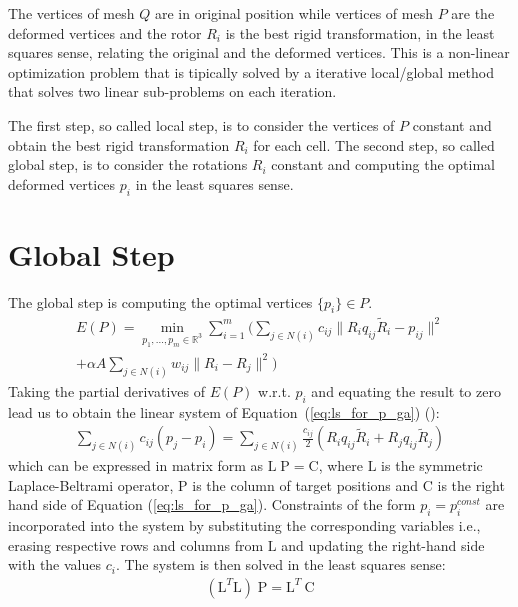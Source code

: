 \documentclass{birkjour}
\numberwithin{equation}{section}
\begin{document}
The vertices of mesh $Q$ are in original position while vertices of mesh $P$ are the deformed vertices and the rotor $R_i$ is the best rigid transformation, in the least squares sense, relating the original and the deformed vertices.
This is a non-linear optimization problem that is tipically solved by a iterative local/global method that solves two linear sub-problems on each iteration. 

The first step, so called local step, is to consider the vertices of $P$ constant and obtain the best rigid transformation $R_i$ for each cell. The second step, so called global step, is to consider the rotations $R_i$ constant and computing the optimal deformed vertices $p_i$ in the least squares sense. 

\section{Global Step}

The global step is computing the optimal vertices $\{p_i\} \in P$.
\begin{eqnarray*}
E(P) = \min_{p_1,...,p_m \in \mathbb R^3} \sum_{i=1}^m  (  \sum_{j \in N(i)} { c_{ij} \|R_i q_{ij} \tilde R_i -  p_{ij}\|^2 } \\
+ \alpha A \sum_{j \in N(i)} { w_{ij} \|R_i - R_j\|^2 } )
\end{eqnarray*}
Taking the partial derivatives of $E(P)$ w.r.t. $p_i$ and equating the result to zero lead us to obtain the linear system of Equation~(\ref{eq:ls_for_p_ga}) (\cite{Lopez2013}):
\begin{eqnarray}
\label{eq:ls_for_p_ga}
\sum_{j \in N(i)} { c_{ij} (p_j - p_i) } = \sum_{j \in N(i)} { \frac{c_{ij}}{2} (R_i q_{ij} \tilde  R_i + R_j q_{ij} \tilde R_j) }
\end{eqnarray}
which can be expressed in matrix form as $\mathrm L \; \mathrm P = \mathrm C$, where $\mathrm L$ is the symmetric Laplace-Beltrami operator, $\mathrm P$ is the column of target positions and $\mathrm C$ is the right hand side of Equation (\ref{eq:ls_for_p_ga}). Constraints of the form $p_i = p^{const}_i$ are incorporated into the system by substituting the corresponding variables i.e., erasing respective rows and columns from $\mathrm L$ and updating the right-hand side with the values $c_i$. The system is then solved in the least squares sense:
\begin{eqnarray}
(\mathrm L^T \mathrm L) \; \mathrm P = \mathrm L^T \ \mathrm C
\end{eqnarray}
\end{document}
